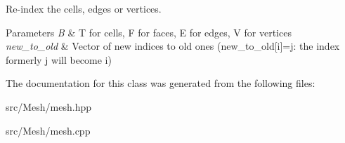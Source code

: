 Re-\/index the cells, edges or vertices. 


\begin{DoxyParams}{Parameters}
{\em B} & T for cells, F for faces, E for edges, V for vertices \\
\hline
{\em new\+\_\+to\+\_\+old} & Vector of new indices to old ones (new\+\_\+to\+\_\+old\mbox{[}i\mbox{]}=j\+: the index formerly j will become i) \\
\hline
\end{DoxyParams}


The documentation for this class was generated from the following files\+:\begin{DoxyCompactItemize}
\item 
src/\+Mesh/mesh.\+hpp\item 
src/\+Mesh/mesh.\+cpp\end{DoxyCompactItemize}
